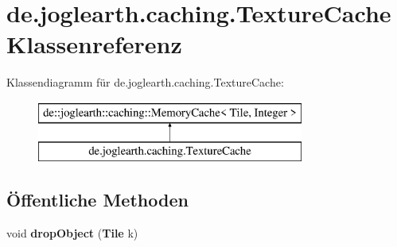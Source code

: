 \section{de.\-joglearth.\-caching.\-Texture\-Cache Klassenreferenz}
\label{classde_1_1joglearth_1_1caching_1_1_texture_cache}
Klassendiagramm für de.\-joglearth.\-caching.\-Texture\-Cache\-:\begin{figure}[H]
\begin{center}
\leavevmode
\includegraphics[height=2.000000cm]{classde_1_1joglearth_1_1caching_1_1_texture_cache}
\end{center}
\end{figure}
\subsection*{Öffentliche Methoden}
\begin{DoxyCompactItemize}
\item 
void {\bfseries drop\-Object} ({\bf Tile} k)\label{classde_1_1joglearth_1_1caching_1_1_texture_cache_a524987e4c88d3ec8bec0bdd4e10ac860}

\end{DoxyCompactItemize}
